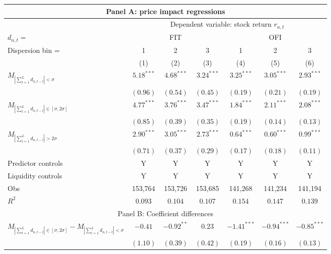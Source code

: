 \begin{tabular}{lcccccc}
  \hline \multicolumn{7}{c}{Panel A: price impact regressions} \\
 \hline
    & \multicolumn{6}{c}{Dependent variable: stock return $r_{n,t}$} \\

    \cmidrule(l){2-7} $d_{n,t} = $ & \multicolumn{3}{c}{FIT} & \multicolumn{3}{c}{OFI} \\
 \cmidrule(l){2-4} \cmidrule(l){5-7} Dispersion bin = & 1 & 2 & 3 & 1 & 2 & 3 \\
  \cmidrule(l){2-4} \cmidrule(l){5-7} \vspace{5pt} & (1) & (2) & (3) & (4) & (5) & (6) \\ 
  $M_{\left|\sum_{l=1}^L d_{n,t-l}\right| < \sigma}$ & $5.18^{***}$ & $4.68^{***}$ & $3.24^{***}$ & $3.25^{***}$ & $3.05^{***}$ & $2.93^{***}$ \\ 
   & $(0.96)$ & $(0.54)$ & $(0.45)$ & $(0.19)$ & $(0.21)$ & $(0.19)$ \\ 
  $M_{\left|\sum_{l=1}^L d_{n,t-l}\right| \in [\sigma, 2\sigma]}$ & $4.77^{***}$ & $3.76^{***}$ & $3.47^{***}$ & $1.84^{***}$ & $2.11^{***}$ & $2.08^{***}$ \\ 
   & $(0.85)$ & $(0.39)$ & $(0.35)$ & $(0.19)$ & $(0.14)$ & $(0.13)$ \\ 
  $M_{\left|\sum_{l=1}^L d_{n,t-l}\right| > 2 \sigma}$ & $2.90^{***}$ & $3.05^{***}$ & $2.73^{***}$ & $0.64^{***}$ & $0.60^{***}$ & $0.99^{***}$ \\ 
   \vspace{5pt} & $(0.71)$ & $(0.37)$ & $(0.29)$ & $(0.17)$ & $(0.18)$ & $(0.11)$ \\ 
  Predictor controls & Y & Y & Y & Y & Y & Y \\ 
   \vspace{5pt}Liquidity controls & Y & Y & Y & Y & Y & Y \\ 
  Obs & 153,764 & 153,726 & 153,685 & 141,268 & 141,234 & 141,194 \\ 
  $R^2$ & $0.093$ & $0.104$ & $0.107$ & $0.154$ & $0.147$ & $0.139$ \\ 
   \hline \multicolumn{7}{c}{Panel B: Coefficient differences} \\
 \hline$M_{\left|\sum_{l=1}^L d_{n,t-l}\right| \in [\sigma, 2\sigma]}-M_{\left|\sum_{l=1}^L d_{n,t-l}\right| < \sigma}$ & $-0.41$ & $-0.92^{**}$ & $0.23$ & $-1.41^{***}$ & $-0.94^{***}$ & $-0.85^{***}$ \\ 
   & $(1.10)$ & $(0.39)$ & $(0.42)$ & $(0.19)$ & $(0.16)$ & $(0.13)$ \\ 

\end{tabular}
